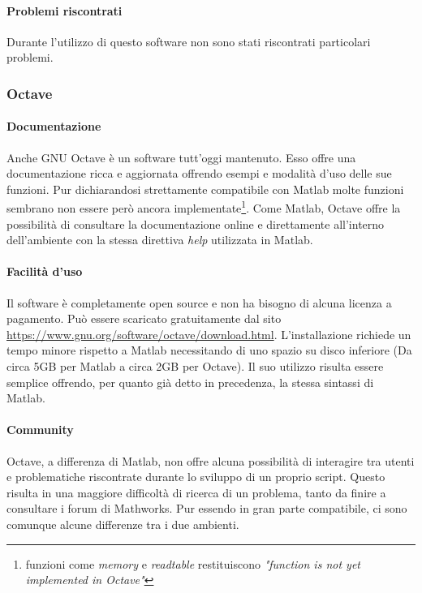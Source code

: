 \paragraph{Problemi riscontrati}
Durante l'utilizzo di questo software non sono stati riscontrati particolari problemi.

\subsubsection{Octave}
\paragraph{Documentazione}
Anche GNU Octave è un software tutt'oggi mantenuto. Esso offre una documentazione ricca e aggiornata offrendo esempi e modalità d'uso delle sue funzioni.
Pur dichiarandosi strettamente compatibile con Matlab molte funzioni sembrano non essere però ancora implementate\footnote{funzioni come \emph{memory} e \emph{readtable} restituiscono \emph{"function is not yet implemented in Octave"}}.
Come Matlab, Octave offre la possibilità di consultare la documentazione online e direttamente all'interno dell'ambiente con la stessa direttiva \emph{help}
utilizzata in Matlab.
\paragraph{Facilità d'uso}
Il software è completamente open source e non ha bisogno di alcuna licenza a pagamento. Può essere scaricato gratuitamente dal sito \url{https://www.gnu.org/software/octave/download.html}.
L'installazione richiede un tempo minore rispetto a Matlab necessitando di uno spazio su disco inferiore (Da circa 5GB per Matlab a circa 2GB per Octave). %
Il suo utilizzo risulta essere semplice offrendo, per quanto già detto in precedenza, la stessa sintassi di Matlab.
\paragraph{Community}
Octave, a differenza di Matlab, non offre alcuna possibilità di interagire tra utenti e problematiche riscontrate durante lo sviluppo di un proprio script.
Questo risulta in una maggiore difficoltà di ricerca di un problema, tanto da finire a consultare i forum di Mathworks. Pur essendo in gran parte compatibile,
ci sono comunque alcune differenze tra i due ambienti.
